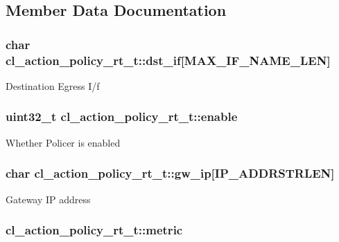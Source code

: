 \subsection{Member Data Documentation}
\hypertarget{structcl__action__policy__rt__t_a6aa2133efd09dc7436c3841411995593}{
\subsubsection[{dst\-\_\-if}]{\setlength{\rightskip}{0pt plus 5cm}char cl\-\_\-action\-\_\-policy\-\_\-rt\-\_\-t\-::dst\-\_\-if\mbox{[}{\bf M\-A\-X\-\_\-\-I\-F\-\_\-\-N\-A\-M\-E\-\_\-\-L\-E\-N}\mbox{]}}}\label{structcl__action__policy__rt__t_a6aa2133efd09dc7436c3841411995593}
Destination Egress I/f \hypertarget{structcl__action__policy__rt__t_ae40238d575958ca5624f67fffc5bda51}{
\subsubsection[{enable}]{\setlength{\rightskip}{0pt plus 5cm}uint32\-\_\-t cl\-\_\-action\-\_\-policy\-\_\-rt\-\_\-t\-::enable}}\label{structcl__action__policy__rt__t_ae40238d575958ca5624f67fffc5bda51}
Whether Policer is enabled \hypertarget{structcl__action__policy__rt__t_a31b6fdbc2d494bd6776d8c82db845494}{
\subsubsection[{gw\-\_\-ip}]{\setlength{\rightskip}{0pt plus 5cm}char cl\-\_\-action\-\_\-policy\-\_\-rt\-\_\-t\-::gw\-\_\-ip\mbox{[}{\bf I\-P\-\_\-\-A\-D\-D\-R\-S\-T\-R\-L\-E\-N}\mbox{]}}}\label{structcl__action__policy__rt__t_a31b6fdbc2d494bd6776d8c82db845494}
Gateway I\-P address \hypertarget{structcl__action__policy__rt__t_ada9b7857102fc1d05857d0cb0a066656}{
\subsubsection[{metric}]{ cl\-\_\-action\-\_\-policy\-\_\-rt\-\_\-t\-::metric}}\label{structcl__action__policy__rt__t_ada9b7857102fc1d05857d0cb0a066656}
